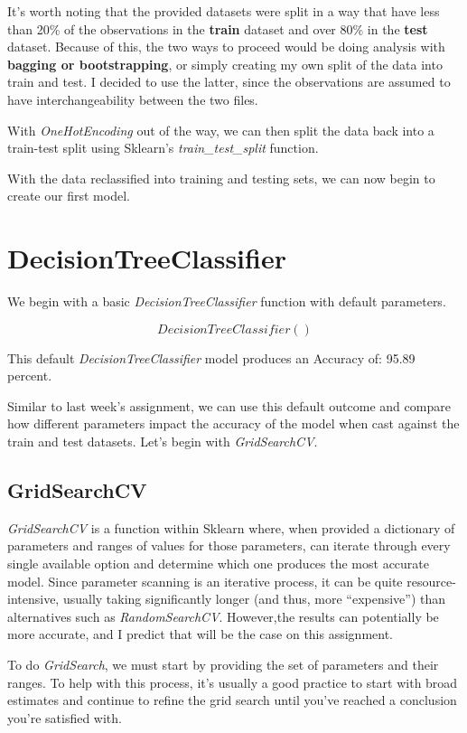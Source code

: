 \documentclass[notitlepage]{report}
\begin{document}
It's worth noting that the provided datasets were split in a way that have less than 20\% of the observations in the \textbf{train} dataset and over 80\% in the \textbf{test} dataset. Because of this, the two ways to proceed would be doing analysis with \textbf{bagging or bootstrapping}, or simply creating my own split of the data into train and test. I decided to use the latter, since the observations are assumed to have interchangeability between the two files.

With \textit{OneHotEncoding} out of the way, we can then split the data back into a train-test split using Sklearn's \textit{train\_test\_split} function.


With the data reclassified into training and testing sets, we can now begin to create our first model.

\section*{DecisionTreeClassifier}
We begin with a basic \textit{DecisionTreeClassifier} function with default parameters.

$$
DecisionTreeClassifier()
$$

This default \textit{DecisionTreeClassifier} model produces an Accuracy of: 95.89 percent.

Similar to last week's assignment, we can use this default outcome and compare how different parameters impact the accuracy of the model when cast against the train and test datasets. Let's begin with \textit{GridSearchCV}.

\subsection*{GridSearchCV}
\textit{GridSearchCV} is a function within Sklearn where, when provided a dictionary of parameters and ranges of values for those parameters, can iterate through every single available option and determine which one produces the most accurate model. Since parameter scanning is an iterative process, it can be quite resource-intensive, usually taking significantly longer (and thus, more ``expensive'') than alternatives such as \textit{RandomSearchCV}. However,the results can potentially be more accurate, and I predict that will be the case on this assignment.

To do \textit{GridSearch}, we must start by providing the set of parameters and their ranges. To help with this process, it's usually a good practice to start with broad estimates and continue to refine the grid search until you've reached a conclusion you're satisfied with.
\end{document}
